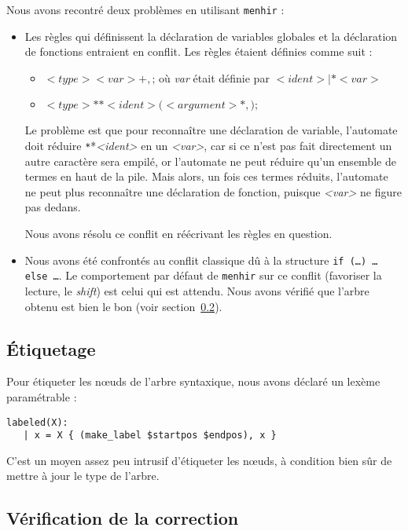 \documentclass[a4paper]{article}
\begin{document}
Nous avons recontré deux problèmes en utilisant \texttt{menhir} :
\begin{itemize}
    \item Les règles qui définissent la déclaration de variables globales et la déclaration de fonctions entraient en conflit.
          Les règles étaient définies comme suit :
          \begin{itemize}
              \item $<type> <var>+,\texttt{;}$ où \emph{var} était définie par $<ident> | \texttt{*} <var>$
              \item $<type> \texttt{*}* <ident>\texttt{(} <argument>*, \texttt{);}$
          \end{itemize}
          Le problème est que pour reconnaître une déclaration de variable, l'automate doit réduire \texttt{*}*\emph{<ident>} en un \emph{<var>}, car si ce n'est pas fait directement un autre caractère sera empilé, or l'automate ne peut réduire qu'un ensemble de termes en haut de la pile. Mais alors, un fois ces termes réduits, l'automate ne peut plus reconnaître une déclaration de fonction, puisque \emph{<var>} ne figure pas dedans.

          Nous avons résolu ce conflit en réécrivant les règles en question.

      \item Nous avons été confrontés au conflit classique dû à la structure \texttt{if (…) … else …}.
            Le comportement par défaut de \texttt{menhir} sur ce conflit (favoriser la lecture, le \emph{shift}) est celui qui est attendu. Nous avons vérifié que l'arbre obtenu est bien le bon (voir section~\ref{subsec:html}).
\end{itemize}

\subsection{Étiquetage}

Pour étiqueter les nœuds de l'arbre syntaxique, nous avons déclaré un lexème paramétrable :

\begin{verbatim}
labeled(X):
   | x = X { (make_label $startpos $endpos), x }
\end{verbatim}

C'est un moyen assez peu intrusif d'étiqueter les nœuds, à condition bien sûr de mettre à jour le type de l'arbre.

\subsection{Vérification de la correction}
\label{subsec:html}
\end{document}
